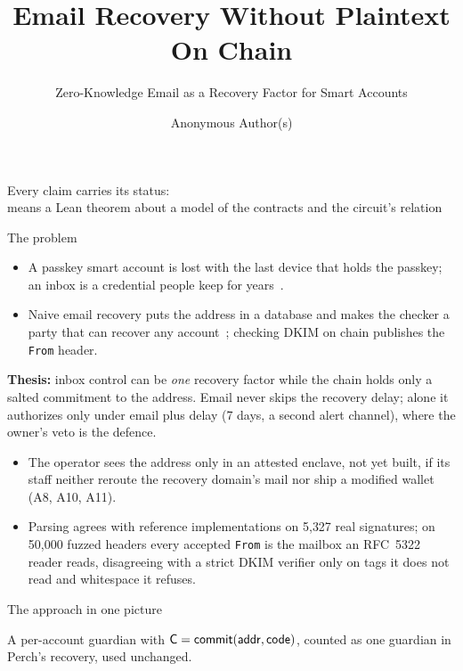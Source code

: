 \documentclass[aspectratio=169,11pt]{beamer}
\title{Email Recovery Without Plaintext On Chain}
\subtitle{Zero-Knowledge Email as a Recovery Factor for Smart Accounts}
\author{Anonymous Author(s)}
\date{}
\begin{document}
\begin{frame}
  \titlepage
  \centering\small
  Every claim carries its status:
      \\[2pt]
  \footnotesize{} means a Lean theorem about a model of the contracts and the circuit's relation
\end{frame}

\begin{frame}{The problem}
  \small
  \begin{itemize}
    \item A passkey smart account is lost with the last device that holds
      the passkey; an inbox is a credential people keep for
      years~\cite{bonneau-recovery}.
    \item Naive email recovery puts the address in a database and makes the
      checker a party that can recover any account~\cite{sep30}; checking
      DKIM on chain publishes the \texttt{From} header.
  \end{itemize}
  \smallskip
  \textbf{Thesis:} inbox control can be \emph{one} recovery factor while the
  chain holds only a salted commitment to the address. Email never skips the
  recovery delay; alone it authorizes only under email plus delay (7 days, a
  second alert channel), where the owner's veto is the defence.
  \par\smallskip\footnotesize
  \begin{itemize}
    \item The operator sees the address only in an attested enclave, not yet
      built, if its staff neither reroute the recovery domain's mail nor
      ship a modified wallet (A8, A10, A11).
    \item Parsing agrees with reference implementations on 5{,}327 real
      signatures; on 50{,}000 fuzzed headers every accepted \texttt{From} is
      the mailbox an RFC~5322 reader reads, disagreeing with a strict DKIM
      verifier only on tags it does not read and whitespace it
      refuses.
  \end{itemize}
\end{frame}

\begin{frame}{The approach in one picture}
  \centering
  
  \par\medskip\small
  A per-account guardian with $\mathsf{C} = \mathsf{commit}(\mathsf{addr}, \mathsf{code})$, counted as one
  guardian in Perch's recovery, used unchanged.
\end{frame}
\end{document}
